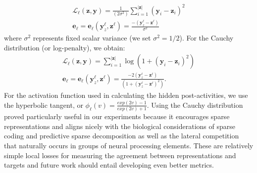 \documentclass[letterpaper]{article} %
\begin{document}
\begin{align}
\mathcal{L}_\ell(\mathbf{z}, \mathbf{y}) = \frac{1}{(2 \sigma^2)} \sum^{|\mathbf{z}|}_{i=1} (\mathbf{y}_i - \mathbf{z}_i)^2 \nonumber \\
\mathbf{e}_\ell = \mathbf{e}_\ell(\mathbf{y}^\ell_z, \mathbf{z}^\ell) = \frac{-(\mathbf{y}^\ell_z - \mathbf{z}^\ell)}{\sigma^2} \label{gaussian_loss}
\end{align}
where $\sigma^2$ represents fixed scalar variance (we set $\sigma^2 = 1/2$). For the Cauchy distribution (or log-penalty), we obtain:
\begin{align}
\mathcal{L}_\ell(\mathbf{z}, \mathbf{y}) = \sum^{|\mathbf{z}|}_{i=1} \log(1 + (\mathbf{y}_i - \mathbf{z}_i)^2) \nonumber \\
\mathbf{e}_\ell = \mathbf{e}_\ell(\mathbf{y}^\ell_z, \mathbf{z}^\ell) = \frac{-2 (\mathbf{y}^\ell_z - \mathbf{z}^\ell)}{(1 + (\mathbf{y}^\ell_z - \mathbf{z}^\ell)^2)} \mbox{.} \label{cauchy_loss}
\end{align}
For the activation function used in calculating the hidden post-activities, we use the hyperbolic tangent, or $\phi_\ell(v) = \frac{exp(2v) - 1}{exp(2v) + 1}$. Using the Cauchy distribution proved particularly useful in our experiments because it encourages sparse representations and aligns nicely with the biological considerations of sparse coding \cite{olshausen1997sparse} and predictive sparse decomposition \cite{kavukcuoglu2010fast} as well as the lateral competition \cite{rao1999predictive} that naturally occurs in groups of neural processing elements. %
These are relatively simple local losses for measuring the agreement between representations and targets and future work should entail developing even better metrics.
\end{document}
